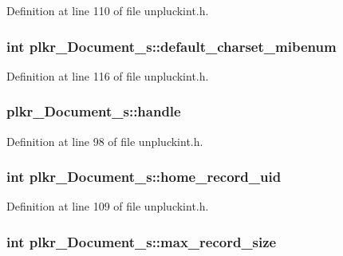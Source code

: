 Definition at line 110 of file unpluckint.\+h.

\hypertarget{structplkr__Document__s_a588365c6be19fc1264b2549aed61d9d0}{
\subsubsection[{default\+\_\+charset\+\_\+mibenum}]{\setlength{\rightskip}{0pt plus 5cm}int plkr\+\_\+\+Document\+\_\+s\+::default\+\_\+charset\+\_\+mibenum}}\label{structplkr__Document__s_a588365c6be19fc1264b2549aed61d9d0}


Definition at line 116 of file unpluckint.\+h.

\hypertarget{structplkr__Document__s_ae1a048bf4797c696d6313c1e08ce3577}{
\subsubsection[{handle}]{ plkr\+\_\+\+Document\+\_\+s\+::handle}}\label{structplkr__Document__s_ae1a048bf4797c696d6313c1e08ce3577}


Definition at line 98 of file unpluckint.\+h.

\hypertarget{structplkr__Document__s_a855d2555348d33aa63c23324fca29775}{
\subsubsection[{home\+\_\+record\+\_\+uid}]{\setlength{\rightskip}{0pt plus 5cm}int plkr\+\_\+\+Document\+\_\+s\+::home\+\_\+record\+\_\+uid}}\label{structplkr__Document__s_a855d2555348d33aa63c23324fca29775}


Definition at line 109 of file unpluckint.\+h.

\hypertarget{structplkr__Document__s_af5e11a562c37e9684e4930b776170f85}{
\subsubsection[{max\+\_\+record\+\_\+size}]{\setlength{\rightskip}{0pt plus 5cm}int plkr\+\_\+\+Document\+\_\+s\+::max\+\_\+record\+\_\+size}}\label{structplkr__Document__s_af5e11a562c37e9684e4930b776170f85}


